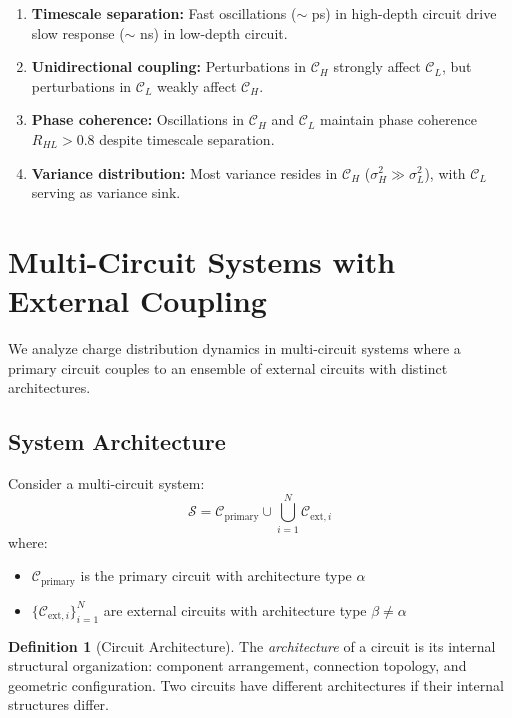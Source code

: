 \documentclass[12pt,a4paper]{article}
\theoremstyle{plain}
\theoremstyle{definition}
\newtheorem{definition}[theorem]{Definition}
\theoremstyle{remark}
\begin{document}
\begin{enumerate}
\item \textbf{Timescale separation:} Fast oscillations ($\sim$ ps) in high-depth circuit drive slow response ($\sim$ ns) in low-depth circuit.

\item \textbf{Unidirectional coupling:} Perturbations in $\mathcal{C}_H$ strongly affect $\mathcal{C}_L$, but perturbations in $\mathcal{C}_L$ weakly affect $\mathcal{C}_H$.

\item \textbf{Phase coherence:} Oscillations in $\mathcal{C}_H$ and $\mathcal{C}_L$ maintain phase coherence $R_{HL} > 0.8$ despite timescale separation.

\item \textbf{Variance distribution:} Most variance resides in $\mathcal{C}_H$ ($\sigma^2_H \gg \sigma^2_L$), with $\mathcal{C}_L$ serving as variance sink.
\end{enumerate}
\section{Multi-Circuit Systems with External Coupling}
\label{sec:multi_circuit}

We analyze charge distribution dynamics in multi-circuit systems where a primary circuit couples to an ensemble of external circuits with distinct architectures.

\subsection{System Architecture}

Consider a multi-circuit system:
\begin{equation}
\mathcal{S} = \mathcal{C}_{\text{primary}} \cup \bigcup_{i=1}^{N} \mathcal{C}_{\text{ext},i}
\end{equation}
where:
\begin{itemize}
\item $\mathcal{C}_{\text{primary}}$ is the primary circuit with architecture type $\alpha$
\item $\{\mathcal{C}_{\text{ext},i}\}_{i=1}^{N}$ are external circuits with architecture type $\beta \neq \alpha$
\end{itemize}

\begin{definition}[Circuit Architecture]
\label{def:architecture}
The \emph{architecture} of a circuit is its internal structural organization: component arrangement, connection topology, and geometric configuration. Two circuits have different architectures if their internal structures differ.
\end{definition}
\end{document}
